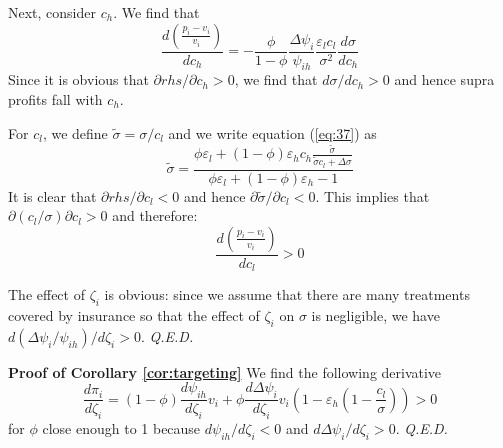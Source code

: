 \documentclass[12pt,english,a4paper]{article}
\newcommand{\qed}{\hspace*{\fill} {\em Q.E.D.}}
\begin{document}
Next, consider \(c_h\). We find that
\begin{equation}
\label{eq:57}
\frac{d\left(\frac{p_i-v_i}{v_i} \right)}{d c_h} = - \frac{\phi}{1-\phi} \frac{\Delta \psi_i}{\psi_{ih}} \frac{\varepsilon_l c_l}{\sigma^2} \frac{d\sigma}{d c_h}
\end{equation}
Since it is obvious that \(\partial rhs/\partial c_h >0\), we find that \(d\sigma/dc_h>0\) and hence supra profits fall with \(c_h\).

For \(c_l\), we define \(\tilde \sigma = \sigma/c_l\) and we write equation (\ref{eq:37}) as
\begin{equation}
\label{eq:64}
\tilde \sigma = \frac{\phi \varepsilon_l +(1-\phi) \varepsilon_h c_h \frac{\tilde \sigma}{\tilde \sigma c_l + \Delta \sigma} }{\phi \varepsilon_l +(1-\phi) \varepsilon_h-1}
\end{equation}
It is clear that \(\partial rhs/\partial c_l <0\) and hence \(\partial \tilde \sigma /\partial c_l <0\). This implies that \(\partial (c_l/\sigma)\partial c_l > 0\) and therefore:
\begin{equation}
\label{eq:65}
\frac{d\left(\frac{p_i-v_i}{v_i} \right)}{dc_l} >0
\end{equation}

The effect of \(\zeta_i\) is obvious: since we assume that there are many treatments covered by insurance so that the effect of \(\zeta_i\) on \(\sigma\) is negligible, we have \(d(\Delta\psi_i/\psi_{ih})/d\zeta_i>0\).\qed

\textbf{Proof of Corollary \ref{cor:targeting}}
We find the following derivative
\begin{equation}
\label{eq:66}
\frac{d \pi_i}{d \zeta_i} = (1-\phi) \frac{d \psi_{ih}}{d\zeta_i} v_i+\phi \frac{d\Delta\psi_i}{d\zeta_i}v_i (1-\varepsilon_h(1-\frac{c_l}{\sigma})) > 0
\end{equation}
for \(\phi\) close enough to 1 because \(d\psi_{ih}/d\zeta_{i}<0\) and \(d\Delta\psi_i/d\zeta_i>0\).\qed
\end{document}
